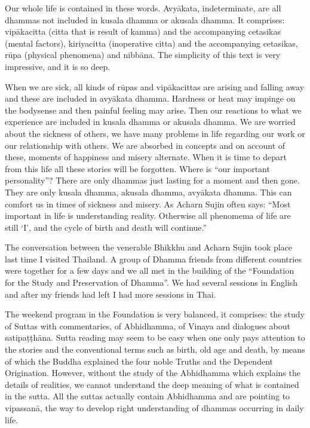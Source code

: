 Our whole life is contained in these words. Avyākata, indeterminate, are all dhammas not included in kusala dhamma or akusala dhamma. It comprises: vipākacitta (citta that is result of kamma) and the accompanying cetasikas (mental factors), kiriyacitta (inoperative citta) and the accompanying cetasikas, rūpa (physical phenomena) and nibbāna. The simplicity of this text is very impressive, and it is so deep.

When we are sick, all kinds of rūpas and vipākacittas are arising and falling away and these are included in avyākata dhamma. Hardness or heat may impinge on the bodysense and then painful feeling may arise. Then our reactions to what we experience are included in kusala dhamma or akusala dhamma. We are worried about the sickness of others, we have many problems in life regarding our work or our relationship with others. We are absorbed in concepts and on account of these, moments of happiness and misery alternate. When it is time to depart from this life all these stories will be forgotten. Where is ``our important personality''? There are only dhammas just lasting for a moment and then gone. They are only kusala dhamma, akusala dhamma, avyākata dhamma. This can comfort us in times of sickness and misery. As Acharn Sujin often says: ``Most important in life is understanding reality. Otherwise all phenomema of life are still `I', and the cycle of birth and death will continue.''

The conversation between the venerable Bhikkhu and Acharn Sujin took place last time I visited Thailand. A group of Dhamma friends from different countries were together for a few days and we all met in the building of the ``Foundation for the Study and Preservation of Dhamma''. We had several sessions in English and after my friends had left I had more sessions in Thai.

The weekend program in the Foundation is very balanced, it comprises: the study of Suttas with commentaries, of Abhidhamma, of Vinaya and dialogues about satipaṭṭhāna. Sutta reading may seem to be easy when one only pays attention to the stories and the conventional terms such as birth, old age and death, by means of which the Buddha explained the four noble Truths and the Dependent Origination. However, without the study of the Abhidhamma which explains the details of realities, we cannot understand the deep meaning of what is contained in the sutta. All the suttas actually contain Abhidhamma and are pointing to vipassanā, the way to develop right understanding of dhammas occurring in daily life.

